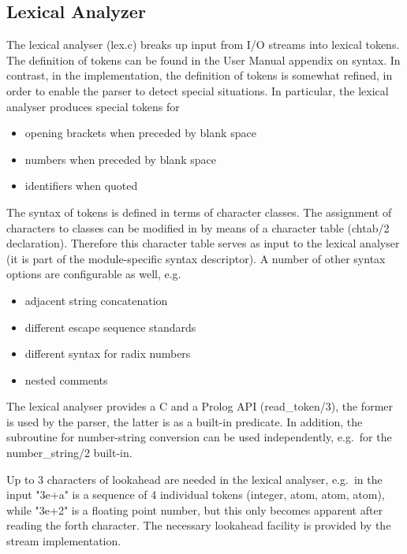 \subsection{Lexical Analyzer}

The lexical analyser (lex.c) breaks up input from I/O streams into
lexical tokens.  The definition of tokens can be found in the User
Manual appendix on syntax.  In contrast, in the implementation, the
definition of tokens is somewhat refined, in order to enable the
parser to detect special situations.  In particular, the lexical
analyser produces special tokens for
\begin{itemize}
\item opening brackets when preceded by blank space
\item numbers when preceded by blank space
\item identifiers when quoted
\end{itemize}
The syntax of tokens is defined in terms of character classes.  The
assignment of characters to classes can be modified in {\eclipse} by
means of a character table (chtab/2 declaration). Therefore this
 character table serves as input to the lexical analyser (it is part
 of the module-specific syntax descriptor).
A number of other syntax options are configurable as well, e.g.\
\begin{itemize}
\item adjacent string concatenation
\item different escape sequence standards
\item different syntax for radix numbers
\item nested comments
\end{itemize}
The lexical analyser provides a C and a Prolog API (read_token/3), the
former is used by the parser, the latter is as a built-in predicate. 
In addition, the subroutine for number-string conversion can be used
independently, e.g.\ for the number_string/2 built-in.

Up to 3 characters of lookahead are needed in the lexical analyser, e.g.\
in the input "3e+a" is a sequence of 4 individual tokens (integer, atom,
atom, atom), while "3e+2" is a floating point number, but this only
becomes apparent after reading the forth character. The necessary
lookahead facility is provided by the stream implementation.


